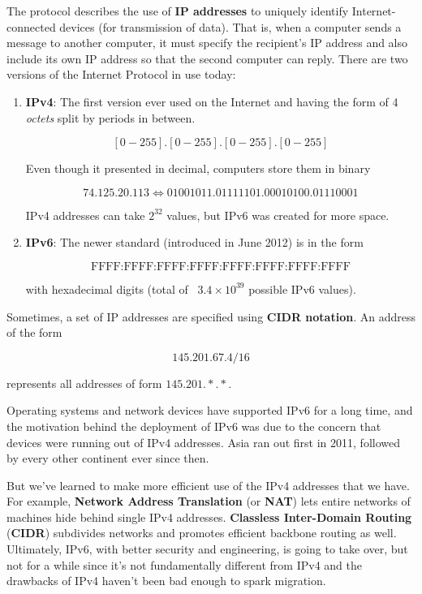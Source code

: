 \documentclass{article}
\begin{document}
    \begin{definition}[IP Address]
      The protocol describes the use of \textbf{IP addresses} to uniquely identify Internet-connected devices (for transmission of data). That is, when a computer sends a message to another computer, it must specify the recipient's IP address and also include its own IP address so that the second computer can reply. There are two versions of the Internet Protocol in use today: 
      \begin{enumerate}
          \item \textbf{IPv4}: The first version ever used on the Internet and having the form of 4 \textit{octets} split by periods in between. 

            \[[0-255].[0-255].[0-255].[0-255]\]

          Even though it presented in decimal, computers store them in binary 

            \[74.125.20.113 \iff 01001011.01111101.00010100.01110001\]

          IPv4 addresses can take $2^{32}$ values, but IPv6 was created for more space.

          \item \textbf{IPv6}: The newer standard (introduced in June 2012) is in the form 

            \[\text{FFFF:FFFF:FFFF:FFFF:FFFF:FFFF:FFFF:FFFF}\]

          with hexadecimal digits (total of ~$3.4 \times 10^{39}$ possible IPv6 values). 
      \end{enumerate}
    \end{definition}


    \begin{definition}
      Sometimes, a set of IP addresses are specified using \textbf{CIDR notation}. An address of the form 

        \[145.201.67.4/16\]

      represents all addresses of form $145.201.\ast.\ast$. 
    \end{definition}

    Operating systems and network devices have supported IPv6 for a long time, and the motivation behind the deployment of IPv6 was due to the concern that devices were running out of IPv4 addresses. Asia ran out first in 2011, followed by every other continent ever since then. 

    But we've learned to make more efficient use of the IPv4 addresses that we have. For example, \textbf{Network Address Translation} (or \textbf{NAT}) lets entire networks of machines hide behind single IPv4 addresses. \textbf{Classless Inter-Domain Routing} (\textbf{CIDR}) subdivides networks and promotes efficient backbone routing as well. Ultimately, IPv6, with better security and engineering, is going to take over, but not for a while since it's not fundamentally different from IPv4 and the drawbacks of IPv4 haven't been bad enough to spark migration. 
\end{document}
